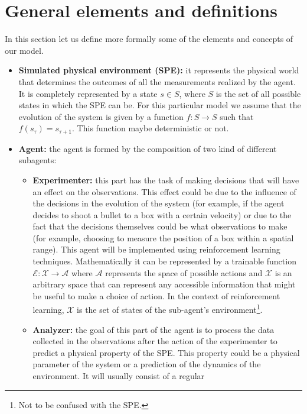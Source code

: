 \documentclass[11pt,a4paper,twoside]{report}
\newcommand{\+}{\textnormal{+} }
\theoremstyle{definition}
\numberwithin{equation}{chapter}
\begin{document}
\section{General elements and definitions}
In this section let us define more formally some of the elements and concepts of
our model.
\begin{itemize}
    \item \textbf{Simulated physical environment (SPE): } it represents the
    physical world that determines the outcomes of all the measurements realized
    by the agent. It is completely represented by a state $ s \in S $, where $S$
    is the set of all possible states in which the SPE can be. For this
    particular model we assume that the evolution of the system is given by a
    function $f: S \rightarrow S$ such that $f(s_\tau)=s_{\tau+1}$. This
    function maybe deterministic or not.
    \item \textbf{Agent:} the agent is formed by the composition of two kind of
    different subagents:
    \begin{itemize}
        \item \textbf{Experimenter:} this part has the task of making decisions
        that will have an effect on the observations. This effect could be due
        to the influence of the decisions in the evolution of the system (for
        example, if the agent decides to shoot a bullet to a box with a certain
        velocity) or due to the fact that the decisions themselves could be what
        observations to make (for example, choosing to measure the position of a
        box within a spatial range). This agent will be implemented using
        reinforcement learning techniques. Mathematically it can be represented
        by a trainable function $\mathscr{E}:\mathcal{X}\rightarrow\mathcal{A}$ where
        $\mathcal{A}$ represents the space of possible actions and $\mathcal{X}$
        is an arbitrary space that can represent any accessible information that
        might be useful to make a choice of action. In the context of
        reinforcement learning, $\mathcal{X}$ is the set of states of the
        sub-agent's environment\footnote{Not to be confused with the SPE.}.
        \item \textbf{Analyzer:} the goal of this part of the agent is to
        process the data collected in the observations after the action of the
        experimenter to predict a physical property of the SPE. This property
        could be a physical parameter of the system or a prediction of the
        dynamics of the environment. It will usually consist of a regular

\end{itemize}
\end{itemize}
\end{document}
